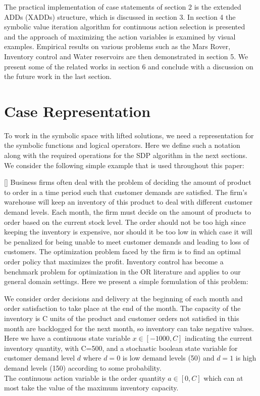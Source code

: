 \documentclass[letterpaper]{article}
\renewcommand{\-}{\text{-}}
\begin{document}
The practical implementation of case statements of section 2 is the extended ADDs (XADDs) structure, which is discussed in section 3. In section 4 the symbolic value iteration algorithm for continuous action selection is presented and the approach of maximizing the action variables is examined by visual examples. Empirical results on various problems such as the Mars Rover, Inventory control and Water reservoirs are then demonstrated in section 5. We present some of the related works in section 6 and conclude with a discussion on the future work in the last section. 

\section{Case Representation}

To work in the symbolic space with lifted solutions, we need a representation for the symbolic functions and logical operators. Here we define such a notation along with the required operations for the SDP algorithm in the next sections. We consider the following simple example that is used throughout this paper:

[\InventoryControl] Business firms often deal with the problem of deciding  the amount of product to order in a time period such that customer demands are satisfied. 
The firm's warehouse will keep an inventory of this product to deal with different customer demand levels. Each month, the firm must decide on the amount of products 
to order based on the current stock level.
The order should not be too high since keeping the inventory is expensive, nor should it be too low in which case
it will be penalized for being unable to meet customer demands and leading to loss of customers. 
The optimization problem faced by the firm is to find an optimal 
order policy that maximizes the profit. Inventory control has become a benchmark problem for optimization in the OR literature and applies to our general domain settings. Here we present a simple formulation of this problem:

\begin{example*}[\InventoryControl]
We consider order decisions and delivery at the beginning of each month and order satisfaction to take place at the end of the month. 
The capacity of the inventory is C units of the product and customer orders not satisfied in this month are backlogged for the next month, so inventory can take negative values. 
Here we have a continuous state variable $x \in [-1000,C]$ indicating the current inventory quantity, with C=500, and a stochastic boolean state variable for customer demand level $d$ where $d=0$ is low demand levels (50) and $d=1$ is high demand levels (150) according to some probability. \\
The continuous action variable is the order quantity $a \in [0,C]$ which can at most take the value of the maximum inventory capacity. \\
\end{example*}
\end{document}

